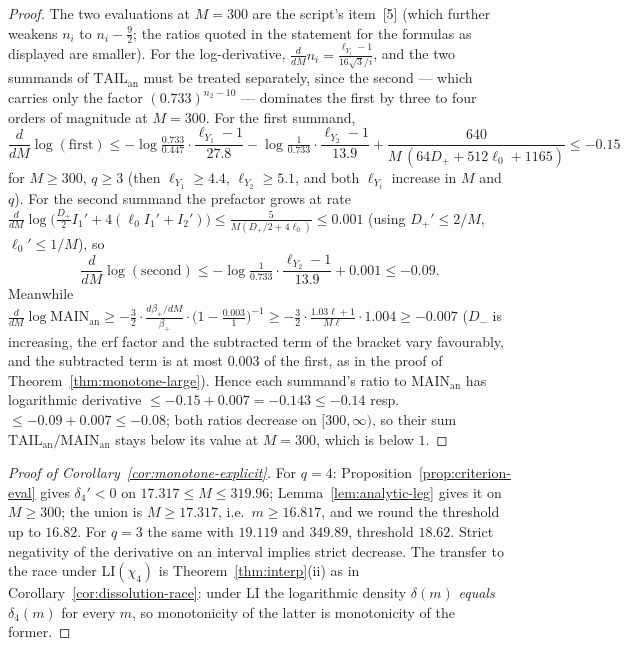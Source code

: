 \begin{proof}
The two evaluations at $M=300$ are the script's item~[5] (which
further weakens $n_i$ to $n_i-\tfrac92$; the ratios quoted in the
statement for the formulas as displayed are smaller). For the
log-derivative, $\tfrac d{dM}n_i=\tfrac{\ell_{Y_i}-1}{16\sqrt3/i}$,
and the two summands of $\mathrm{TAIL}_{\mathrm{an}}$ must be treated
separately, since the second --- which carries only the factor
$(0.733)^{n_2-10}$ --- dominates the first by three to four orders of
magnitude at $M=300$. For the first summand,
\[
\frac d{dM}\log(\text{first})
\le-\log\tfrac{0.733}{0.447}\cdot\frac{\ell_{Y_1}-1}{27.8}
-\log\tfrac1{0.733}\cdot\frac{\ell_{Y_2}-1}{13.9}
+\frac{640}{M\,(64D_++512\ell_0+1165)}
\le-0.15
\]
for $M\ge300$, $q\ge3$ (then $\ell_{Y_1}\ge4.4$,
$\ell_{Y_2}\ge5.1$, and both $\ell_{Y_i}$ increase in $M$ and $q$).
For the second summand the prefactor grows at rate
$\tfrac d{dM}\log\bigl(\tfrac{D_+}2I_1'+4(\ell_0I_1'+I_2')\bigr)
\le\tfrac{5}{M(D_+/2+4\ell_0)}\le0.001$
(using $D_+'\le2/M$, $\ell_0'\le1/M$), so
\[
\frac d{dM}\log(\text{second})
\le-\log\tfrac1{0.733}\cdot\frac{\ell_{Y_2}-1}{13.9}+0.001
\le-0.09 .
\]
Meanwhile
$\frac d{dM}\log\mathrm{MAIN}_{\mathrm{an}}
\ge-\tfrac32\cdot\tfrac{d\beta_+/dM}{\beta_+}
\cdot\bigl(1-\tfrac{0.003}{1}\bigr)^{-1}
\ge-\tfrac32\cdot\tfrac{1.03\ell+1}{M\ell}\cdot1.004\ge-0.007$
($D_-$ is increasing, the erf factor and the subtracted term of the
bracket vary favourably, and the subtracted term is at most $0.003$
of the first, as in the proof of
Theorem~\ref{thm:monotone-large}). Hence each summand's ratio to
$\mathrm{MAIN}_{\mathrm{an}}$ has logarithmic derivative
$\le-0.15+0.007=-0.143\le-0.14$ resp.\
$\le-0.09+0.007\le-0.08$; both ratios decrease on $[300,\infty)$,
so their sum $\mathrm{TAIL}_{\mathrm{an}}/\mathrm{MAIN}_{\mathrm{an}}$
stays below its value at $M=300$, which is below $1$.
\end{proof}

\begin{proof}[Proof of Corollary~\ref{cor:monotone-explicit}]
For $q=4$: Proposition~\ref{prop:criterion-eval} gives
$\delta_4'<0$ on $17.317\le M\le319.96$;
Lemma~\ref{lem:analytic-leg} gives it on $M\ge300$; the union is
$M\ge17.317$, i.e.\ $m\ge16.817$, and we round the threshold up to
$16.82$. For $q=3$ the same with $19.119$ and $349.89$, threshold
$18.62$. Strict negativity of the derivative on an interval implies
strict decrease. The transfer to the race under LI$(\chi_4)$ is
Theorem~\ref{thm:interp}(ii) as in
Corollary~\ref{cor:dissolution-race}: under LI the logarithmic
density $\delta(m)$ \emph{equals} $\delta_4(m)$ for every $m$, so
monotonicity of the latter is monotonicity of the former.
\end{proof}

